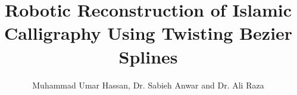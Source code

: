 \documentclass[12pt,onecolumn,aps,prb,preprint]{revtex4}   %
\begin{document}
\title{Robotic Reconstruction of Islamic Calligraphy Using Twisting Bezier Splines}
\author{Muhammad Umar Hassan, Dr. Sabieh Anwar and Dr. Ali Raza}
%

\maketitle
\tableofcontents






\end{document}
